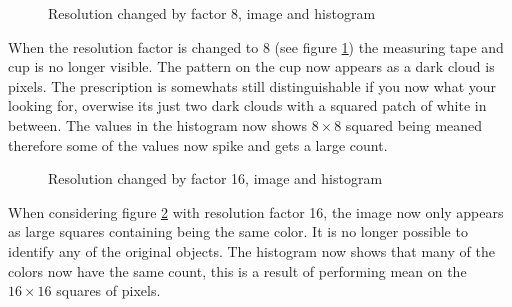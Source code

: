 \documentclass[a4paper, 10pt, final]{article}
\begin{document}
\begin{figure}[!h]
\centering
{}
\caption{Resolution changed by factor 8, image and histogram}
\label{fig:resolutionFactor8}
\end{figure}

When the resolution factor is changed to 8 (see figure
\ref{fig:resolutionFactor8}) the measuring tape and cup is no longer
visible. The pattern on the cup now appears as a dark cloud is
pixels. The prescription is somewhats still distinguishable if you now
what your looking for, overwise its just two dark clouds with a
squared patch of white in between. The values in the histogram now
shows $8 \times 8$ squared being meaned therefore some of the values
now spike and gets a large count.

\begin{figure}[!h]
\centering
{}
\caption{Resolution changed by factor 16, image and histogram}
\label{fig:resolutionFactor16}
\end{figure}

When considering figure \ref{fig:resolutionFactor16} with resolution factor 16, the image now only appears as large squares containing being the same color. It is no longer possible to identify any of the original objects. The histogram now shows that many of the colors now have the same count, this is a result of performing mean on the $16 \times 16$ squares of pixels.


%
%
\end{document}
